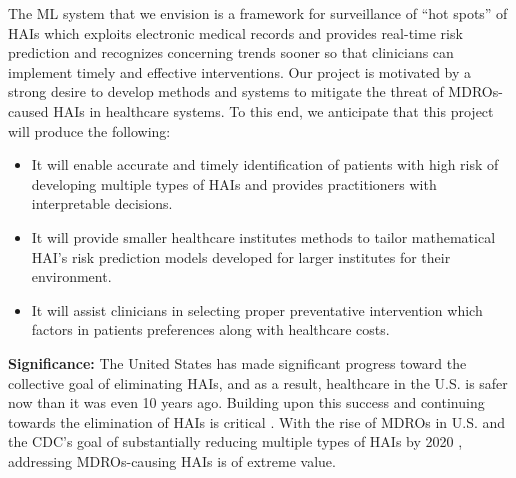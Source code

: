 
The ML system that we envision is a framework for surveillance of ``hot spots'' of HAIs which exploits electronic medical records and provides real-time risk prediction and recognizes concerning trends sooner so that clinicians can implement timely and effective interventions. Our project is motivated by a strong desire to develop methods and systems to mitigate the threat of MDROs-caused HAIs in healthcare systems. To this end, we anticipate that this project will produce the following:
\begin{itemize}
	\item It will enable accurate and timely identification of patients with high risk of developing multiple types of HAIs and provides practitioners with interpretable decisions. 
	\item It will provide smaller healthcare institutes methods to tailor mathematical HAI's risk prediction models developed for larger institutes for their environment. 
	\item It will assist clinicians in selecting proper preventative intervention which factors in patients preferences along with healthcare costs. 
\end{itemize}

{\bf Significance:} The United States has made significant progress toward the collective goal of eliminating HAIs, and as a result, healthcare in the U.S. is safer now than it was even 10 years ago. Building upon this success and continuing towards the elimination of HAIs is critical \cite{actionplan}. With the rise of MDROs in U.S. \cite{pop2005rising,edlin1992outbreak, whitney2000increasing} and the CDC's goal of substantially reducing multiple types of HAIs by 2020 \cite{milestones}, addressing MDROs-causing HAIs is of extreme value.  

